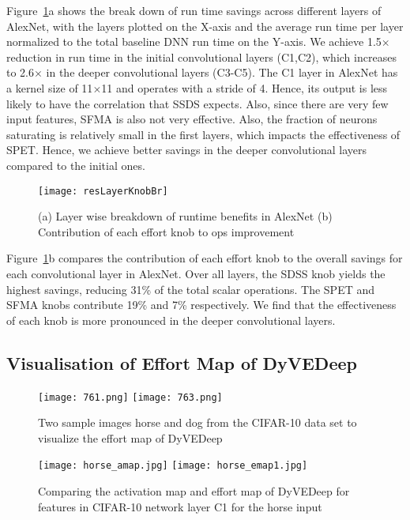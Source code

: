 \documentclass{article} %
\begin{document}
Figure~\ref{fig:AlexBreak}a shows the break down of run time savings across different layers of AlexNet, with the layers plotted on the X-axis and the average run time per layer normalized to the total baseline DNN run time on the Y-axis. We achieve 1.5$\times$ reduction in run time in the initial convolutional layers (C1,C2), which increases to 2.6$\times$ in the deeper convolutional layers (C3-C5). The C1 layer in AlexNet has a kernel size of 11$\times$11 and operates with a stride of 4. Hence, its output is less likely to have the correlation that SSDS expects. Also, since there are very few input features, SFMA is also not very effective. Also, the fraction of neurons saturating is relatively small in the first layers, which impacts the effectiveness of SPET. Hence, we achieve better savings in the deeper convolutional layers compared to the initial ones.

\begin{figure}[htb]
\begin{center}
\texttt{[image: resLayerKnobBr]}
\end{center}
\caption{(a) Layer wise breakdown of runtime benefits in AlexNet (b) Contribution of each effort knob to ops improvement}
\label{fig:AlexBreak}
\end{figure}

Figure~\ref{fig:AlexBreak}b compares the contribution of each effort knob to the overall savings for each convolutional layer in AlexNet. Over all layers, the SDSS knob yields the highest savings, reducing 31\% of the total scalar operations. The SPET and SFMA knobs contribute 19\% and 7\% respectively. We find that the effectiveness of each knob is more pronounced in the deeper convolutional layers.

\subsection{Visualisation of Effort Map of DyVEDeep}

\begin{figure}[htb]
\begin{center}
\texttt{[image: 761.png]}
\texttt{[image: 763.png]}
\end{center}
\caption{Two sample images horse and dog from the CIFAR-10 data set to visualize the effort map of DyVEDeep}
\label{fig:horse-dog}
\end{figure}

\begin{figure}[htb]
\begin{center}
\texttt{[image: horse\_amap.jpg]} \texttt{[image: horse\_emap1.jpg]}
\end{center}
\caption{Comparing the activation map and effort map of DyVEDeep for features in CIFAR-10 network layer C1 for the horse input}
\label{fig:horsemap}
\end{figure}
\end{document}
